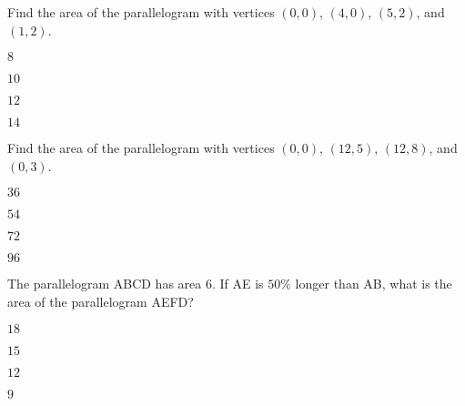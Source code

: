 \documentclass{article}
\begin{document}
\begin{readinessAssuranceTest}

\item Find the area of the parallelogram with vertices $(0,0)$, $(4,0)$, $(5,2)$, and $(1,2)$.
\begin{multicols}{2}
\begin{readinessAssuranceTestChoices}
\item $8$ %
\item $10$
\item $12$
\item $14$
\end{readinessAssuranceTestChoices}


\end{multicols}

\item Find the area of the parallelogram with vertices $(0,0)$, $(12,5)$, $(12,8)$, and $(0,3)$.
\begin{multicols}{2}
\begin{readinessAssuranceTestChoices}
\item $36$ %
\item $54$
\item $72$
\item $96$
\end{readinessAssuranceTestChoices}


\end{multicols}

\item The parallelogram ABCD has area $6$.  If AE is $50\%$ longer than AB, what is the area of the parallelogram AEFD?
\begin{multicols}{2}
\begin{readinessAssuranceTestChoices}
\item $18$
\item $15$
\item $12$
\item $9$  %
\end{readinessAssuranceTestChoices}


\end{multicols}
\end{readinessAssuranceTest}
\end{document}
